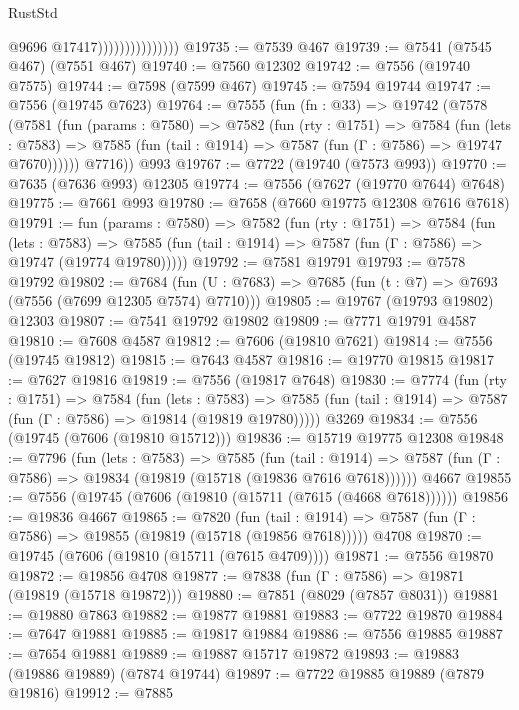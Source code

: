 \begin{lexlean}{RustStd}
\begin{coremodule}
                                  @9696
                                  @17417)))))))))))))))
@19735 := @7539 @467
@19739 := @7541 (@7545 @467) (@7551 @467)
@19740 := @7560 @12302
@19742 := @7556 (@19740 @7575)
@19744 := @7598 (@7599 @467)
@19745 := @7594 @19744
@19747 := @7556 (@19745 @7623)
@19764 := @7555
    (fun (fn : @33) =>
    @19742
      (@7578
        (@7581
          (fun (params : @7580) =>
          @7582
            (fun (rty : @1751) =>
            @7584
              (fun (lets : @7583) =>
              @7585 (fun (tail : @1914) => @7587 (fun (Γ : @7586) => @19747 @7670))))))
        @7716))
    @993
@19767 := @7722 (@19740 (@7573 @993))
@19770 := @7635 (@7636 @993) @12305
@19774 := @7556 (@7627 (@19770 @7644) @7648)
@19775 := @7661 @993
@19780 := @7658 (@7660 @19775 @12308 @7616 @7618)
@19791 := fun (params : @7580) =>
  @7582
    (fun (rty : @1751) =>
    @7584
      (fun (lets : @7583) =>
      @7585 (fun (tail : @1914) => @7587 (fun (Γ : @7586) => @19747 (@19774 @19780)))))
@19792 := @7581 @19791
@19793 := @7578 @19792
@19802 := @7684
    (fun (U : @7683) => @7685 (fun (t : @7) => @7693 (@7556 (@7699 @12305 @7574) @7710)))
@19805 := @19767 (@19793 @19802) @12303
@19807 := @7541 @19792 @19802
@19809 := @7771 @19791 @4587
@19810 := @7608 @4587
@19812 := @7606 (@19810 @7621)
@19814 := @7556 (@19745 @19812)
@19815 := @7643 @4587
@19816 := @19770 @19815
@19817 := @7627 @19816
@19819 := @7556 (@19817 @7648)
@19830 := @7774
    (fun (rty : @1751) =>
    @7584
      (fun (lets : @7583) =>
      @7585 (fun (tail : @1914) => @7587 (fun (Γ : @7586) => @19814 (@19819 @19780)))))
    @3269
@19834 := @7556 (@19745 (@7606 (@19810 @15712)))
@19836 := @15719 @19775 @12308
@19848 := @7796
    (fun (lets : @7583) =>
    @7585
      (fun (tail : @1914) =>
      @7587 (fun (Γ : @7586) => @19834 (@19819 (@15718 (@19836 @7616 @7618))))))
    @4667
@19855 := @7556 (@19745 (@7606 (@19810 (@15711 (@7615 (@4668 @7618))))))
@19856 := @19836 @4667
@19865 := @7820
    (fun (tail : @1914) => @7587 (fun (Γ : @7586) => @19855 (@19819 (@15718 (@19856 @7618)))))
    @4708
@19870 := @19745 (@7606 (@19810 (@15711 (@7615 @4709))))
@19871 := @7556 @19870
@19872 := @19856 @4708
@19877 := @7838 (fun (Γ : @7586) => @19871 (@19819 (@15718 @19872)))
@19880 := @7851 (@8029 (@7857 @8031))
@19881 := @19880 @7863
@19882 := @19877 @19881
@19883 := @7722 @19870
@19884 := @7647 @19881
@19885 := @19817 @19884
@19886 := @7556 @19885
@19887 := @7654 @19881
@19889 := @19887 @15717 @19872
@19893 := @19883 (@19886 @19889) (@7874 @19744)
@19897 := @7722 @19885 @19889 (@7879 @19816)
@19912 := @7885

\end{coremodule}
\end{lexlean}
